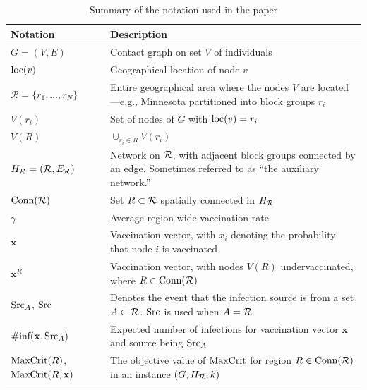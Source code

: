 \begin{table}[ht]
\begin{footnotesize}
\centering \caption{
Summary of the notation used in the paper
}
\vspace{-.1in}
\label{table:notation}
\begin{tabular}{|p{0.9in}|p{2.2in}|}
\hline
\textbf{Notation} & \textbf{Description} \\
\hline
$G=(V, E)$ & Contact graph on set $V$ of individuals\\
$\text{loc}(v)$ & Geographical location of node $v$\\
$\mathcal{R}=\{r_1,\ldots,r_N\}$ & Entire geographical area where the nodes $V$ are located---e.g., Minnesota partitioned into block groups $r_i$\\
$V(r_i)$ & Set of nodes of $G$ with $\text{loc}(v)=r_i$\\
$V(R)$ & $\cup_{r_i\in R} V(r_i)$\\
$H_{\mathcal{R}}=(\mathcal{R}, E_{\mathcal{R}})$ & Network on $\mathcal{R}$, with adjacent block groups connected by an edge.
Sometimes referred to as ``the auxiliary network.''\\
$\text{Conn}(\mathcal{R})$ & Set $R\subset \mathcal{R}$  spatially connected in $H_{\mathcal{R}}$\\
$\gamma$ & Average region-wide vaccination rate\\
$\mathbf{x}$ & Vaccination vector, with $x_i$ denoting the probability that node $i$
is vaccinated\\
$\mathbf{x}^R$ & Vaccination vector, with nodes $V(R)$ undervaccinated, where $R\in\text{Conn}(\mathcal{R})$\\
$\text{Src}_A$, $\text{Src}$ & Denotes the event that the  infection source is from a 
set $A\subset \mathcal{R}$. $\text{Src}$ is used when $A=\mathcal{R}$ \\
$\#\text{inf}(\mathbf{x}, \text{Src}_A)$ & Expected number of infections for
vaccination vector $\mathbf{x}$ and source being $\text{Src}_A$\\
$\text{MaxCrit}(R)$, $\text{MaxCrit}(R, \mathbf{x})$ & The objective value of $\text{MaxCrit}{}$ for region
$R\in\text{Conn}(\mathcal{R})$ in an instance $(G, H_{\mathcal{R}}, k)$\\
\hline
\end{tabular}
\end{footnotesize}
\end{table}


